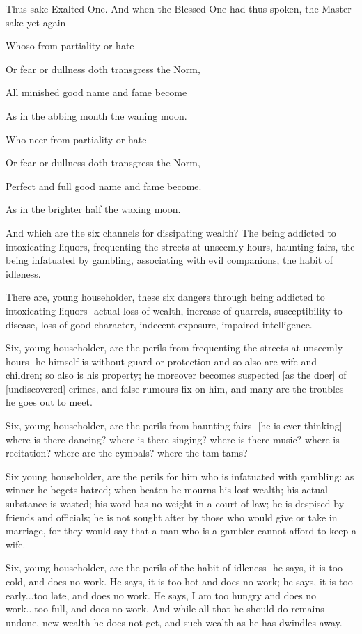 \documentclass[12pt,twoside]{article}
\begin{document}
Thus sake Exalted One. And when the Blessed One had thus spoken, the
Master sake yet again{}-{}-


\bigskip

Whoso from partiality or hate

Or fear or dullness doth transgress the Norm,

All minished good name and fame become

As in the abbing month the waning moon.

Who ne{\textquotesingle}er from partiality or hate

Or fear or dullness doth transgress the Norm,

Perfect and full good name and fame become.

As in the brighter half the waxing moon.


\bigskip

And which are the six channels for dissipating wealth? The being
addicted to intoxicating liquors, frequenting the streets at unseemly
hours, haunting fairs, the being infatuated by gambling, associating
with evil companions, the habit of idleness.

There are, young householder, these six dangers through being addicted
to intoxicating liquors{}-{}-actual loss of wealth, increase of
quarrels, susceptibility to disease, loss of good character, indecent
exposure, impaired intelligence.

Six, young householder, are the perils from frequenting the streets at
unseemly hours{}-{}-he himself is without guard or protection and so
also are wife and children; so also is his property; he moreover
becomes suspected [as the doer] of [undiscovered] crimes, and false
rumours fix on him, and many are the troubles he goes out to meet.

Six, young householder, are the perils from haunting fairs{}-{}-[he is
ever thinking] where is there dancing? where is there singing? where is
there music? where is recitation? where are the cymbals? where the
tam{}-tams?

Six young householder, are the perils for him who is infatuated with
gambling: as winner he begets hatred; when beaten he mourns his lost
wealth; his actual substance is wasted; his word has no weight in a
court of law; he is despised by friends and officials; he is not sought
after by those who would give or take in marriage, for they would say
that a man who is a gambler cannot afford to keep a wife.

Six, young householder, are the perils of the habit of idleness{}-{}-he
says, it is too cold, and does no work. He says, it is too hot and does
no work; he says, it is too early...too late, and does no work. He
says, I am too hungry and does no work...too full, and does no work.
And while all that he should do remains undone, new wealth he does not
get, and such wealth as he has dwindles away.
\end{document}
